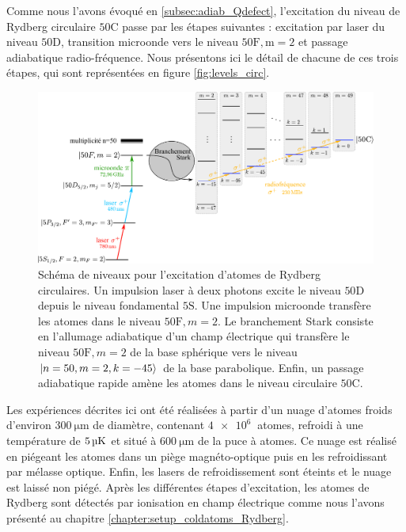 \noindent Comme nous l'avons évoqué en \ref{subsec:adiab_Qdefect}, l'excitation du niveau de Rydberg circulaire $\mathrm{50C}$ passe par les étapes suivantes : excitation par laser du niveau $\mathrm{50D}$, transition microonde vers le niveau $\mathrm{50F,m=2}$ et passage adiabatique radio-fréquence.
Nous présentons ici le détail de chacune de ces trois étapes, qui sont représentées en figure \eqref{fig:levels_circ}.

\begin{figure}[h]
\centering
\includegraphics[width=\linewidth]{figures/circulars/level_scheme_5S50C}
\caption[Schéma de niveaux pour l'excitation d'atomes de Rydberg circulaires]
{Schéma de niveaux pour l'excitation d'atomes de Rydberg circulaires.
Un impulsion laser à deux photons excite le niveau $\mathrm{50D}$ depuis le niveau fondamental $\mathrm{5S}$.
Une impulsion microonde transfère les atomes dans le niveau $\mathrm{50F},m=2$.
Le branchement Stark consiste en l'allumage adiabatique d'un champ électrique qui transfère le niveau $\mathrm{50F},m=2$ de la base sphérique vers le niveau $\ket{n=50,m=2,k=-45}$ de la base parabolique.
Enfin, un passage adiabatique rapide amène les atomes dans le niveau circulaire $\mathrm{50C}$.
}\label{fig:levels_circ}
\end{figure}

Les expériences décrites ici ont été réalisées à partir d'un nuage d'atomes froids d'environ $\SI{300}{\um}$ de diamètre, contenant $\SI{4e6}{}$ atomes, refroidi à une température de $\SI{5}{\si{\micro\kelvin}}$ et situé à $\SI{600}{\um}$ de la puce à atomes.
Ce nuage est réalisé en piégeant les atomes dans un piège magnéto-optique puis en les refroidissant par mélasse optique.
Enfin, les lasers de refroidissement sont éteints et le nuage est laissé non piégé.
Après les différentes étapes d'excitation, les atomes de Rydberg sont détectés par ionisation en champ électrique comme nous l'avons présenté au chapitre \ref{chapter:setup_coldatoms_Rydberg}.

